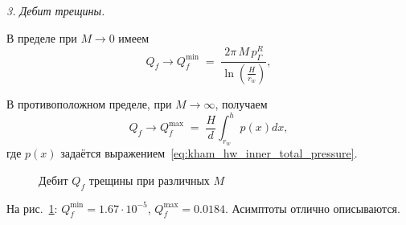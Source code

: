 \documentclass{article}
\newcommand{\mysub}[1]{%
  \par\vspace{0.5em}\noindent{\normalsize\underline{#1}}\par\vspace{0.5em}%
}
\begin{document}
\textit{ 3. Дебит трещины.}

В пределе при $M \to 0$ имеем
\begin{equation}
	Q_f \to Q_f^{\min} \;=\; \frac{2 \pi \, M \, p_{\Gamma}^R}{ \ln\left(\tfrac{H}{r_w}\right)},
	\label{eq:kham_fract_inner_Qf_min_asympt}
\end{equation}

В противоположном пределе, при $M \to \infty$, получаем
\begin{equation}
	Q_f \to Q_f^{\max} \;=\; \frac{H}{d} \int_{r_w}^h p(x) dx,
	\label{eq:kham_fract_inner_Qf_max_asympt}
\end{equation}
где $p(x)$ задаётся выражением~\eqref{eq:kham_hw_inner_total_pressure}.

\begin{figure}[H]
	\centering
	
	\caption{Дебит $Q_f$ трещины при различных $M$}
	\label{fig:kham_fract_inner_qf_assympt}
\end{figure}

На рис.~\ref{fig:kham_fract_inner_qf_assympt}: $Q_f^{\min}=1.67\cdot10^{-5}$, $Q_f^{\max}=0.0184$.
Асимптоты отлично описываются.


\end{document}
